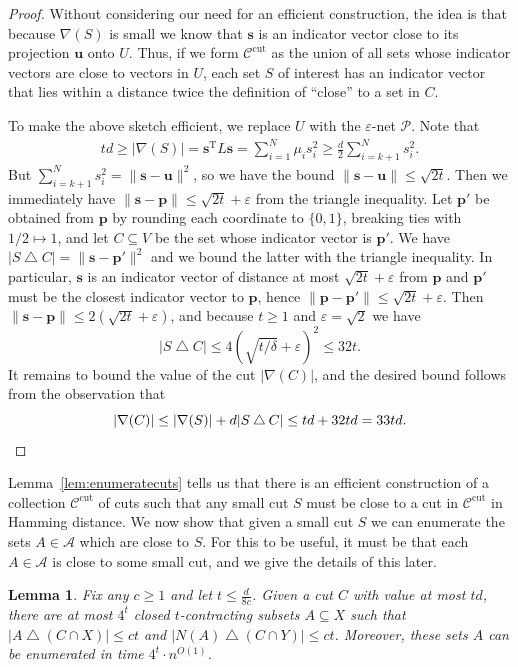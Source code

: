 \documentclass[11pt,letterpaper]{amsart}
\newtheorem{lemma}[theorem]{Lemma}
\theoremstyle{definition}
\newcommand{\eps}{\varepsilon}
\renewcommand{\subset}{\subseteq}
\let\oldtriangle\triangle
\def\triangle{\mathbin{\oldtriangle}}
\newcommand*{\Ccut}{\mathcal{C}^{\mathrm{cut}}}
\newcommand*{\transpose}{\mathrm{T}}
\begin{document}
\begin{proof}
Without considering our need for an efficient construction, the idea is that because $\nabla(S)$ is small we know that $\mathbf s$ is an indicator vector close to its projection $\mathbf u$ onto $U$. 
Thus, if we form $\Ccut$ as the union of all sets whose indicator vectors are close to vectors in $U$, each set $S$ of interest has an indicator vector that lies within a distance twice the definition of ``close'' to a set in $C$.

To make the above sketch efficient, we replace $U$ with the $\eps$-net $\mathcal P$. Note that 
\begin{align*}
    td \ge |\nabla(S)| = \mathbf s^{\transpose} L \mathbf s
    =\sum_{i=1}^N \mu_i s_i^2 \ge \frac{d}{2}\sum_{i=k+1}^N s_i^2.
\end{align*}
But $\sum_{i=k+1}^N s_i^2 = \|\mathbf s-\mathbf u\|^2$, so we have the bound $\|\mathbf s-\mathbf u\|\le \sqrt{2t}$.
Then we immediately have $\|\mathbf s - \mathbf p\| \le \sqrt{2t}+\eps$ from the triangle inequality.
Let $\mathbf p'$ be obtained from $\mathbf p$ by rounding each coordinate to $\{0,1\}$, breaking ties with $1/2 \mapsto 1$, and let $C\subset V$ be the set whose indicator vector is $\mathbf p'$. 
We have $|S\triangle C| = \|\mathbf s-\mathbf p'\|^2$ and we bound the latter with the triangle inequality.
In particular, $\mathbf s$ is an indicator vector of distance at most $\sqrt{2t}+\eps$ from $\mathbf p$ and $\mathbf p'$ must be the closest indicator vector to $\mathbf p$, hence $\|\mathbf p-\mathbf p'\|\le \sqrt{2t}+\eps$. 
Then $\|\mathbf s-\mathbf p\| \le 2(\sqrt{2t} + \eps)$, and because $t\ge 1$ and $\eps=\sqrt{2}$ we have 
\[ |S\triangle C|\le 4(\sqrt{t/\delta} + \eps)^2 \le 32t. \]
It remains to bound the value of the cut $|\nabla(C)|$, and the desired bound follows from the observation that
\[ |\nabla(C)| \le |\nabla(S)|+d|S\triangle C| \le td + 32td = 33td.\qedhere\]
\end{proof}

Lemma~\ref{lem:enumeratecuts} tells us that there is an efficient construction of a collection $\Ccut$ of cuts such that any small cut $S$ must be close to a cut in $\Ccut$ in Hamming distance.
We now show that given a small cut $S$ we can enumerate the sets $A\in\mathcal{A}$ which are close to $S$. For this to be useful, it must be that each $A\in\mathcal{A}$ is close to some small cut, and we give the details of this later.

\begin{lemma}\label{lem:dense_enumerate_nonexp}
Fix any $c\geq 1$ and let $t \leq \frac{d}{8c}$. Given a cut $C$ with value at most $td$, there are at most $4^t$ closed $t$-contracting subsets $A\subset X$ such that $|A \triangle (C \cap X)|\leq ct$ and $|N(A) \triangle (C \cap Y)| \leq ct$. 
Moreover, these sets $A$ can be enumerated in time $4^t \cdot n^{O(1)}$.
\end{lemma}
\end{document}
